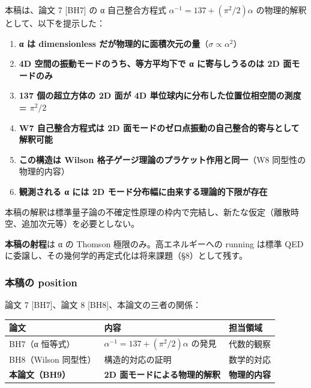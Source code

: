 \documentclass[
  11pt]{ltjsarticle}
\newcounter{none} %
\providecommand{\tightlist}{%
  \setlength{\itemsep}{0pt}\setlength{\parskip}{0pt}}
\begin{document}
本稿は、論文 7 {[}BH7{]} の α 自己整合方程式
\(\alpha^{-1} = 137 + (\pi^2/2)\alpha\)
の物理的解釈として、以下を提示した：

\begin{enumerate}
\def\labelenumi{\arabic{enumi}.}
\tightlist
\item
  \textbf{α は dimensionless
  だが物理的に面積次元の量}（\(\sigma \propto \alpha^2\)）
\item
  \textbf{4D 空間の振動モードのうち、等方平均下で α に寄与しうるのは 2D
  面モードのみ}
\item
  \textbf{137 個の超立方体の 2D 面が 4D
  単位球内に分布した位置位相空間の測度 = \(\pi^2/2\)}
\item
  \textbf{W7 自己整合方程式は 2D
  面モードのゼロ点振動の自己整合的寄与として解釈可能}
\item
  \textbf{この構造は Wilson 格子ゲージ理論のプラケット作用と同一}（W8
  同型性の物理的内容）
\item
  \textbf{観測される α には 2D モード分布幅に由来する理論的下限が存在}
\end{enumerate}

本稿の解釈は標準量子論の不確定性原理の枠内で完結し、新たな仮定（離散時空、追加次元等）を必要としない。

\textbf{本稿の射程}は α の Thomson 極限のみ。高エネルギーへの running
は標準 QED に委譲し、その幾何学的再定式化は将来課題（§8）として残す。

\subsubsection{本稿の position}\label{ux672cux7a3fux306e-position}

論文 7 {[}BH7{]}、論文 8 {[}BH8{]}、本論文の三者の関係：

{\def\LTcaptype{none} %
\begin{longtable}[]{@{}
  >{\raggedright\arraybackslash}p{}
  >{\raggedright\arraybackslash}p{}
  >{\raggedright\arraybackslash}p{}@{}}
\toprule\noalign{}
\begin{minipage}[b]{\linewidth}\raggedright
論文
\end{minipage} & \begin{minipage}[b]{\linewidth}\raggedright
内容
\end{minipage} & \begin{minipage}[b]{\linewidth}\raggedright
担当領域
\end{minipage} \\
\midrule\noalign{}
\endhead
\bottomrule\noalign{}
\endlastfoot
BH7（α 恒等式） & \(\alpha^{-1} = 137 + (\pi^2/2)\alpha\) の発見 &
代数的観察 \\
BH8（Wilson 同型性） & 構造的対応の証明 & 数学的対応 \\
\textbf{本論文（BH9）} & \textbf{2D 面モードによる物理的解釈} &
\textbf{物理的内容} \\
\end{longtable}
}
\end{document}
